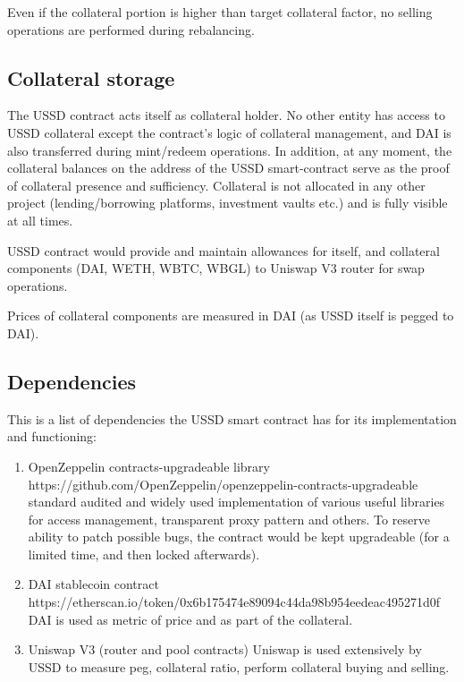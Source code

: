 Even if the collateral portion is higher than target collateral factor, no selling 
operations are performed during rebalancing.

\subsection{Collateral storage}

The USSD contract acts itself as collateral holder. No other entity has access to USSD 
collateral except the contract's logic of collateral management, and DAI is also 
transferred during mint/redeem operations. In addition, at any moment, the collateral 
balances on the address of the USSD smart-contract serve as the proof of collateral 
presence and sufficiency. Collateral is not allocated in any other project 
(lending/borrowing platforms, investment vaults etc.) and is fully visible at all times.

USSD contract would provide and maintain allowances for itself, and collateral components
(DAI, WETH, WBTC, WBGL) to Uniswap V3 router for swap operations.

Prices of collateral components are measured in DAI (as USSD itself is pegged to DAI).

\subsection{Dependencies}

This is a list of dependencies the USSD smart contract has for its implementation
and functioning:

\begin{enumerate}
  \item OpenZeppelin contracts-upgradeable library
  https://github.com/OpenZeppelin/openzeppelin-contracts-upgradeable
  standard audited and widely used implementation of various useful libraries for 
  access management, transparent proxy pattern and others. To reserve ability to 
  patch possible bugs, the contract would be kept upgradeable (for a limited time, 
  and then locked afterwards).
  \item DAI stablecoin contract
       https://etherscan.io/token/0x6b175474e89094c44da98b954eedeac495271d0f
       DAI is used as metric of price and as part of the collateral.
  \item Uniswap V3 (router and pool contracts)
       Uniswap is used extensively by USSD to measure peg, collateral ratio, 
       perform collateral buying and selling.
\end{enumerate}





